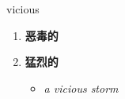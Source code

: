
\begin{frame}
{\huge vicious}
\begin{center}
\begin{enumerate}\Large
  \item \textbf{恶毒的}
  \item \textbf{猛烈的}
  \begin{itemize}
    \item \em{\Large{a vicious storm}}
  \end{itemize}
\end{enumerate}
\end{center}
\end{frame}
